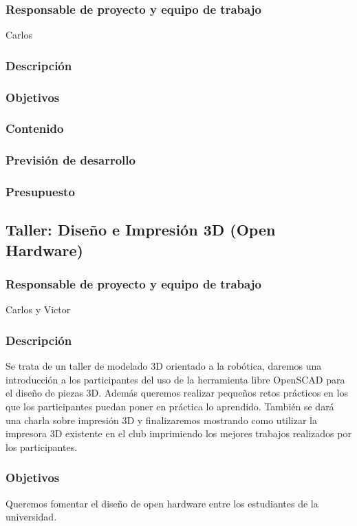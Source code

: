 \documentclass[12pt,twoside]{report}
\begin{document}
\subsubsection{Responsable de proyecto y equipo de trabajo}
Carlos
\subsubsection{Descripción}
\subsubsection{Objetivos}
\subsubsection{Contenido}
\subsubsection{Previsión de desarrollo}
\subsubsection{Presupuesto}


\subsection{Taller: Diseño e Impresión 3D (Open Hardware)}
\subsubsection{Responsable de proyecto y equipo de trabajo}
Carlos y Victor
\subsubsection{Descripción}
Se trata de un taller de modelado 3D orientado a la robótica, daremos una introducción a los participantes del uso de la herramienta libre OpenSCAD para el diseño de piezas 3D. Además queremos realizar pequeños retos prácticos en los que los participantes puedan poner en práctica lo aprendido. También se dará una charla sobre impresión 3D y finalizaremos mostrando como utilizar la impresora 3D existente en el club imprimiendo los mejores trabajos realizados por los participantes.
\subsubsection{Objetivos}
Queremos fomentar el diseño de open hardware entre los estudiantes de la universidad.
\end{document}

